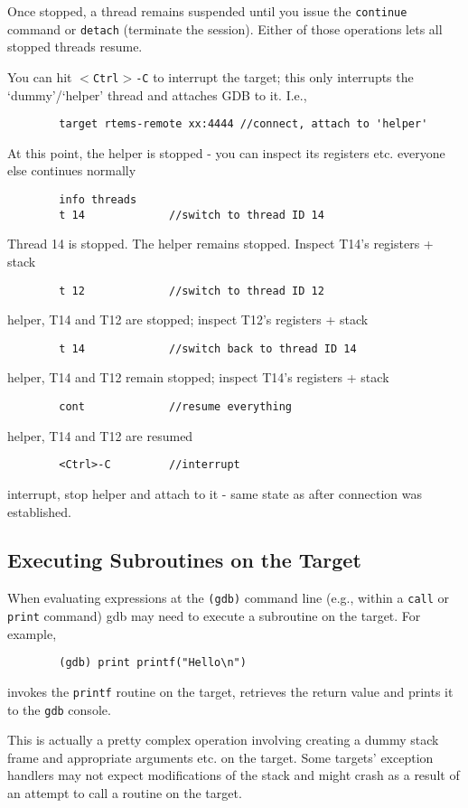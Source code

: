 \documentclass{article}
\newcommand{\cmd}[1]{{\tt #1}}
\begin{document}
	Once stopped, a thread remains suspended until you
	issue the \cmd{continue} command or \cmd{detach} (terminate
	the session). Either of those operations lets all stopped
	threads resume.

	You can hit \cmd{$<$Ctrl$>$-C} to interrupt the target; this
	only interrupts the `dummy'/`helper' thread and
	attaches GDB to it.  I.e., 
\begin{verbatim}
		target rtems-remote xx:4444 //connect, attach to 'helper'
\end{verbatim}
	At this point, the helper is stopped - you can inspect its
	registers etc. everyone else continues normally
\begin{verbatim}
		info threads
		t 14             //switch to thread ID 14
\end{verbatim}
	Thread 14 is stopped. The helper remains stopped. Inspect
	T14's registers + stack
\begin{verbatim}
		t 12             //switch to thread ID 12
\end{verbatim}
	helper, T14 and T12 are stopped; inspect T12's registers + stack
\begin{verbatim}
		t 14             //switch back to thread ID 14
\end{verbatim}
	helper, T14 and T12 remain stopped; inspect T14's registers + stack
\begin{verbatim}
		cont             //resume everything
\end{verbatim}
	helper, T14 and T12 are resumed
\begin{verbatim}
		<Ctrl>-C         //interrupt
\end{verbatim}
	interrupt, stop helper and attach to it - same state as
	after connection was established.

\subsection{Executing Subroutines on the Target}
When evaluating expressions at the \cmd{(gdb)} command line (e.g., within
a \cmd{call} or \cmd{print} command) gdb may need to execute a subroutine
on the target. For example,
\begin{verbatim}
		(gdb) print printf("Hello\n")
\end{verbatim}
invokes the \cmd{printf} routine on the target, retrieves the return value
and prints it to the \cmd{gdb} console.

This is actually a pretty complex operation involving creating a dummy stack
frame and appropriate arguments etc. on the target. Some targets' exception
handlers may not expect modifications of the stack and might crash as a result
of an attempt to call a routine on the target.
\end{document}
